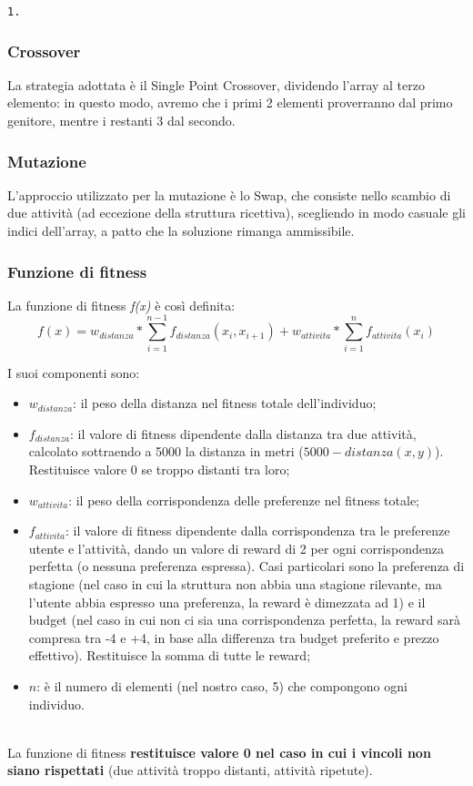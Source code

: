 \documentclass{CSUniSchoolLabReport}
\begin{document}
\texttt{1.}

\subsubsection{Crossover}

La strategia adottata è il Single Point Crossover, dividendo l'array al terzo elemento: in questo modo, avremo che i primi 2 elementi proverranno dal primo genitore, mentre i restanti 3 dal secondo. 

\subsubsection{Mutazione}

L'approccio utilizzato per la mutazione è lo Swap, che consiste nello scambio di due attività (ad eccezione della struttura ricettiva), scegliendo in modo casuale gli indici dell'array, a patto che la soluzione rimanga ammissibile.

\subsubsection{Funzione di fitness}

La funzione di fitness \textit{f(x)} è così definita: \\

$$f(x) = w_{distanza} * \sum_{i=1}^{n-1} f_{distanza}(x_i, x_{i+1}) + w_{attivita} * \sum_{i=1}^{n} f_{attivita}(x_i)$$

I suoi componenti sono:
\begin{itemize}
    \item $w_{distanza}$: il peso della distanza nel fitness totale dell'individuo;
    \item $f_{distanza}$: il valore di fitness dipendente dalla distanza tra due attività, calcolato sottraendo a 5000 la distanza in metri ($5000 - distanza(x, y)$). Restituisce valore 0 se troppo distanti tra loro;
    \item $w_{attivita}$: il peso della corrispondenza delle preferenze nel fitness totale;
    \item $f_{attivita}$: il valore di fitness dipendente dalla corrispondenza tra le preferenze utente e l'attività, dando un valore di reward di 2 per ogni corrispondenza perfetta (o nessuna preferenza espressa). Casi particolari sono la preferenza di stagione (nel caso in cui la struttura non abbia una stagione rilevante, ma l'utente abbia espresso una preferenza, la reward è dimezzata ad 1) e il budget (nel caso in cui non ci sia una corrispondenza perfetta, la reward sarà compresa tra -4 e +4, in base alla differenza tra budget preferito e prezzo effettivo). Restituisce la somma di tutte le reward;
    \item $n$: è il numero di elementi (nel nostro caso, 5) che compongono ogni individuo.
\end{itemize}
~\\
La funzione di fitness \textbf{restituisce valore 0 nel caso in cui i vincoli non siano rispettati} (due attività troppo distanti, attività ripetute).
\end{document}
